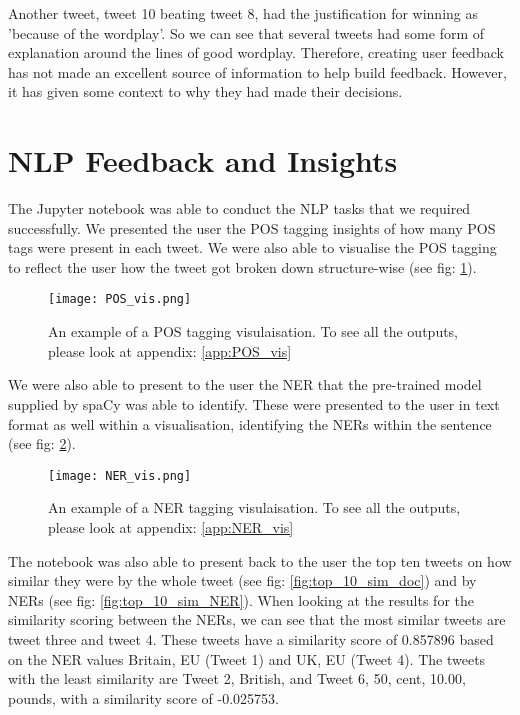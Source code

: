 	Another tweet, tweet 10 beating tweet 8, had the justification for winning as 'because of the wordplay'. So we can see that several tweets had some form of explanation around the lines of good wordplay. Therefore, creating user feedback has not made an excellent source of information to help build feedback. However, it has given some context to why they had made their decisions.


\section{NLP Feedback and Insights}
\label{sec:reaults_NLP}
	
	The Jupyter notebook was able to conduct the NLP tasks that we required successfully. We presented the user the POS tagging insights of how many POS tags were present in each tweet. We were also able to visualise the POS tagging to reflect the user how the tweet got broken down structure-wise (see fig: \ref{fig:POS_example}).
	
	\begin{figure}[h]
		\centering
		\texttt{[image: POS\_vis.png]}
		\caption{An example of a POS tagging visulaisation. To see all the outputs, please look at appendix: \ref{app:POS_vis}}
		\label{fig:POS_example}
		
	\end{figure}

	We were also able to present to the user the NER that the pre-trained model supplied by spaCy was able to identify. These were presented to the user in text format as well within a visualisation, identifying the NERs within the sentence (see fig: \ref{fig:NER_example}).
	
	\begin{figure}[h]
		\centering
		\texttt{[image: NER\_vis.png]}
		\caption{An example of a NER tagging visulaisation. To see all the outputs, please look at appendix: \ref{app:NER_vis}}
		\label{fig:NER_example}
		
	\end{figure}

	The notebook was also able to present back to the user the top ten tweets on how similar they were by the whole tweet (see fig: \ref{fig:top_10_sim_doc}) and by NERs (see fig: \ref{fig:top_10_sim_NER}). When looking at the results for the similarity scoring between the NERs, we can see that the most similar tweets are tweet three and tweet 4. These tweets have a similarity score of 0.857896 based on the NER values Britain, EU (Tweet 1) and UK, EU (Tweet 4). The tweets with the least similarity are Tweet 2, British, and Tweet 6, 50, cent, 10.00, pounds, with a similarity score of -0.025753.
	 
